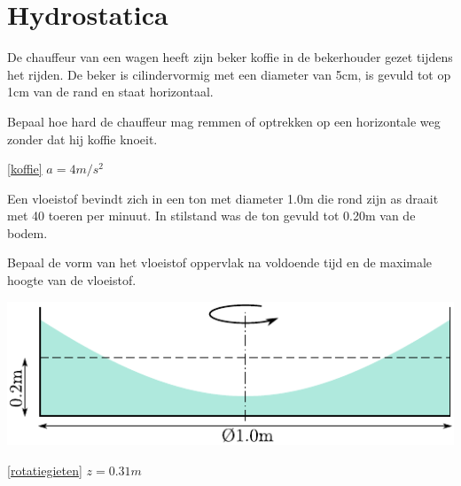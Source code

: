 \chapter{Hydrostatica}
\label{sec:Hydrostatica}
\begin{toepassing}
	\label{koffie}
De chauffeur van een wagen heeft zijn beker koffie in de bekerhouder gezet tijdens het rijden. De beker is cilindervormig met een diameter van 5cm, is gevuld tot op 1cm van de rand en staat horizontaal.
		
Bepaal hoe hard de chauffeur mag remmen of optrekken op een horizontale weg zonder dat hij koffie knoeit.
\end{toepassing}
\begin{antwoord}{\ref{koffie}}
	$a = 4\unit{m/s^2}$
\end{antwoord}
\begin{toepassing}
	\label{rotatiegieten}
Een vloeistof bevindt zich in een ton met diameter 1.0m die rond zijn as draait met 40 toeren per minuut. In stilstand was de ton gevuld tot 0.20m van de bodem. 
		
Bepaal de vorm van het vloeistof oppervlak na voldoende tijd en de maximale hoogte van de vloeistof.

	\centering
	\includegraphics{fig/hydrostatica/rotatiegieten}
\end{toepassing}
\begin{antwoord}{\ref{rotatiegieten}}
	$z = 0.31\unit{m}$ 
\end{antwoord}
